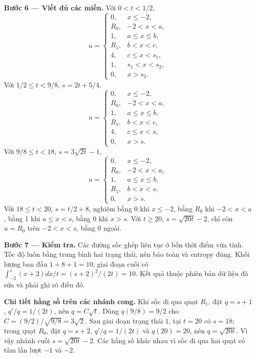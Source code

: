 \textbf{Bước 6 — Viết đủ các miền.} Với $0<t<1/2$,
\[u=\begin{cases}0,&x\le-2,\\R_0,&-2<x<a,\\1,&a\le x\le b,\\R_1,&b<x<c,\\4,&c\le x<s_1,\\1,&s_1<x<s_2,\\0,&x>s_2.\end{cases}\]
Với $1/2\le t<9/8$, $s=2t+5/4$,
\[u=\begin{cases}0,&x\le-2,\\R_0,&-2<x<a,\\1,&a\le x\le b,\\R_1,&b<x<c,\\4,&c\le x<s,\\0,&x>s.\end{cases}\]
Với $9/8\le t<18$, $s=3\sqrt{2t}-1$,
\[u=\begin{cases}0,&x\le-2,\\R_0,&-2<x<a,\\1,&a\le x\le b,\\R_1,&b<x<s,\\0,&x>s.\end{cases}\]
Với $18\le t<20$, $s=t/2+8$, nghiệm bằng 0 khi $x\le-2$, bằng $R_0$ khi $-2<x<a$, bằng 1 khi $a\le x<s$, bằng 0 khi $x>s$. Với $t\ge20$, $s=\sqrt{20t}-2$, chỉ còn $u=R_0$ trên $-2<x<s$, bằng 0 ngoài.

\textbf{Bước 7 — Kiểm tra.} Các đường sốc ghép liên tục ở bốn thời điểm vừa tính. Tốc độ luôn bằng trung bình hai trạng thái, nên bảo toàn và entropy đúng. Khối lượng ban đầu $1+8+1=10$; giai đoạn cuối có $\int_{-2}^s(x+2)dx/t=(s+2)^2/(2t)=10$. Kết quả thuộc phiên bản dữ liệu đã sửa và phải ghi rõ điều đó.

\textbf{Chi tiết hằng số trên các nhánh cong.} Khi sốc đi qua quạt $R_1$, đặt $q=s+1$, $q'/q=1/(2t)$, nên $q=C\sqrt t$. Dùng $q(9/8)=9/2$ cho $C=(9/2)/\sqrt{9/8}=3\sqrt2$. Sau giai đoạn trạng thái $1$, tại $t=20$ có $s=18$; trong quạt $R_0$, đặt $q=s+2$, $q'/q=1/(2t)$ và $q(20)=20$, nên $q=\sqrt{20t}$. Vì vậy nhánh cuối $s=\sqrt{20t}-2$. Các hằng số khác nhau vì sốc đi qua hai quạt có tâm lần lượt $-1$ và $-2$.
